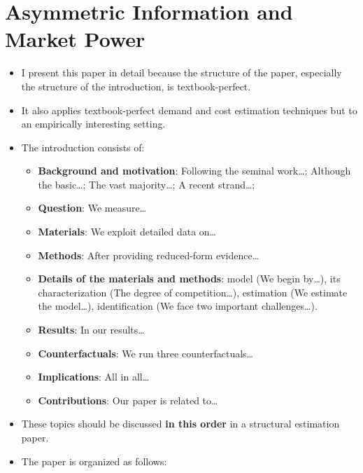 \documentclass[]{book}
\providecommand{\tightlist}{%
  \setlength{\itemsep}{0pt}\setlength{\parskip}{0pt}}
\begin{document}
\section{Asymmetric Information and Market
Power}\label{asymmetric-information-and-market-power}

\begin{itemize}
\tightlist
\item
  I present this paper in detail because the structure of the paper,
  especially the structure of the introduction, is textbook-perfect.
\item
  It also applies textbook-perfect demand and cost estimation techniques
  but to an empirically interesting setting.
\item
  The introduction consists of:

  \begin{itemize}
  \tightlist
  \item
    \textbf{Background and motivation}: Following the seminal
    work\ldots{}; Although the basic\ldots{}; The vast majority\ldots{};
    A recent strand\ldots{};
  \item
    \textbf{Question}: We measure\ldots{}
  \item
    \textbf{Materials}: We exploit detailed data on\ldots{}
  \item
    \textbf{Methods}: After providing reduced-form evidence\ldots{}
  \item
    \textbf{Details of the materials and methods}: model (We begin
    by\ldots{}), its characterization (The degree of
    competition\ldots{}), estimation (We estimate the model\ldots{}),
    identification (We face two important challenges\ldots{}).
  \item
    \textbf{Results}: In our results\ldots{}
  \item
    \textbf{Counterfactuals}: We run three counterfactuals\ldots{}
  \item
    \textbf{Implications}: All in all\ldots{}
  \item
    \textbf{Contributions}: Our paper is related to\ldots{}
  \end{itemize}
\item
  These topics should be discussed \textbf{in this order} in a
  structural estimation paper.
\item
  The paper is organized as follows:


\end{itemize}
\end{document}
